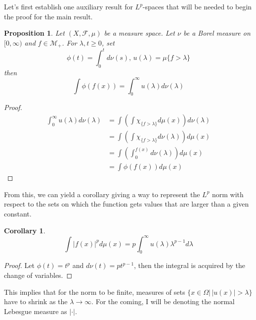 \documentclass[12pt]{artikel1}
\newtheorem{proposition}{Proposition}[section]
\newtheorem{corollary}{Corollary}[theorem]
\begin{document}
Let's first establish one auxiliary result for $L^p$-spaces that will be needed to begin the proof for the main result. 

\begin{proposition}
    Let $(X,\mathcal{F},\mu)$ be a measure space. Let $\nu$ be a Borel measure on $[0,\infty)$ and $f\in\mathcal{M}_+$. For $\lambda,t\geq0$, set
    \begin{equation*}
        \phi(t)=\int_0^td\nu(s),\, u(\lambda)=\mu\{f>\lambda\}
    \end{equation*}
    then
    \begin{equation*}
        \int \phi(f(x))=\int_0^\infty u(\lambda)d\nu(\lambda)
    \end{equation*}
\end{proposition}
\begin{proof}
    \begin{align*}
        \int_0^\infty u(\lambda)d\nu(\lambda)&=\int\left(\int\chi_{\{f>\lambda\}}d\mu(x)\right)d\nu(\lambda) \\
        &= \int\left(\int\chi_{\{f>\lambda\}}d\nu(\lambda)\right)d\mu(x) \\
        &=\int\left(\int_0^{f(x)}d\nu(\lambda)\right)d\mu(x) \\
        &=\int\phi(f(x))d\mu(x)
    \end{align*}
\end{proof}

\noindent From this, we can yield a corollary giving a way to represent the $L^p$ norm with respect to the sets on which the function gets values that are larger than a given constant.

\begin{corollary}
    \begin{equation*}
        \int|f(x)|^pd\mu(x)=p\int_0^\infty u(\lambda)\lambda^{p-1}d\lambda
    \end{equation*}
\end{corollary}
\begin{proof}
    Let $\phi(t)=t^p$ and $d\nu(t)=pt^{p-1}$, then the integral is acquired by the change of variables.
\end{proof}

\noindent This implies that for the norm to be finite, measures of sets $\{x\in\Omega|\,|u(x)|>\lambda\}$ have to shrink as the $\lambda\rightarrow\infty$. For the coming, I will be denoting the normal Lebesgue measure as $|\cdot|$.

\clearpage
\printbibliography
\end{document}
